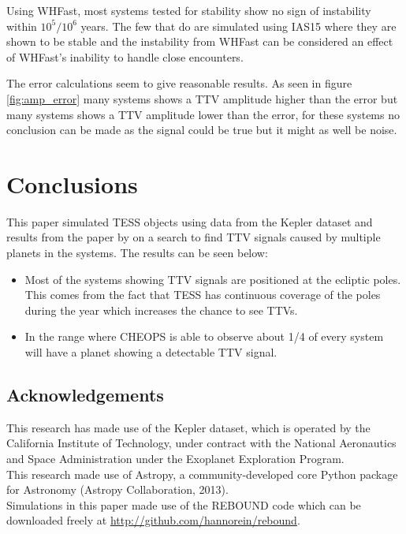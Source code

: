 \documentclass[12pt]{report}
\newcommand{\mnras}{MNRAS}
\newcommand{\aap}{A\&A}
\begin{document}
	Using WHFast, most systems tested for stability show no sign of instability within $10^5 / 10^6$ years. The few that do are simulated using IAS15 where they are shown to be stable and the instability from WHFast can be considered an effect of WHFast's inability to handle close encounters.
	
	The error calculations seem to give reasonable results. As seen in figure \ref{fig:amp_error} many systems shows a TTV amplitude higher than the error but many systems shows a TTV amplitude lower than the error, for these systems no conclusion can be made as the signal could be true but it might as well be noise.
\chapter{Conclusions}
	This paper simulated TESS objects using data from the Kepler dataset and results from the paper by \cite{2015ApJ...809...77S} on a search to find TTV signals caused by multiple planets in the systems. The results can be seen below:
	\begin{itemize}
		\item Most of the systems showing TTV signals are positioned at the ecliptic poles. This comes from the fact that TESS has continuous coverage of the poles during the year which increases the chance to see TTVs.
		\item In the range where CHEOPS is able to observe about 1/4 of every system will have a planet showing a detectable TTV signal.
	\end{itemize}

\section*{Acknowledgements}
This research has made use of the Kepler dataset, which is operated by the California Institute of Technology, under contract with the National Aeronautics and Space Administration under the Exoplanet Exploration Program. \vspace{0.5cm}\\
This research made use of Astropy, a community-developed core Python package for Astronomy (Astropy Collaboration, 2013).\vspace{0.5cm}\\
Simulations in this paper made use of the REBOUND code which can be downloaded freely at \url{http://github.com/hannorein/rebound}.



%
\end{document}
